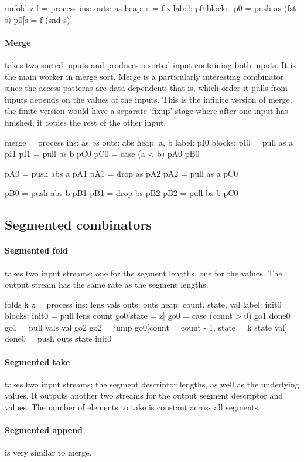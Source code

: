 \begin{code}
unfold z f = process
     ins: 
    outs: as
    heap: {s = f z}
   label: p0
  blocks: p0 = push as (fst s) p0[s = f (snd s)]
\end{code}

\paragraph{Merge} takes two sorted inputs and produces a sorted input containing both inputs.
It is the main worker in merge sort.
Merge is a particularly interesting combinator since the access patterns are data dependent; that is, which order it pulls from inputs depends on the values of the inputs.
This is the infinite version of merge; the finite version would have a separate `fixup' stage where after one input has finished, it copies the rest of the other input.

\begin{code}
merge = process
     ins: as bs
    outs: abs
    heap: {a, b}
   label: pI0
  blocks: pI0 = pull as a  pI1
          pI1 = pull bs b  pC0
          pC0 = case (a < b) pA0 pB0

          pA0 = push abs a pA1
          pA1 = drop as    pA2
          pA2 = pull as  a pC0

          pB0 = push abs b pB1
          pB1 = drop bs    pB2
          pB2 = pull bs  b pC0
\end{code}

\subsection{Segmented combinators}

\paragraph{Segmented fold}
takes two input streams; one for the segment lengths, one for the values.
The output stream has the same rate as the segment lengths.

\begin{code}
folds k z = process
     ins: lens vals
    outs: outs
    heap: {count, state, val}
   label: init0
  blocks: init0 = pull lens count go0[state = z]
          go0   = case (count > 0) go1 done0
          go1   = pull vals val    go2
          go2   = jump go0[count = count - 1, state = k state val]
          done0 = push outs state init0
\end{code}


\paragraph{Segmented take}
takes two input streams; the segment descriptor lengths, as well as the underlying values.
It outputs another two streams for the output segment descriptor and values.
The number of elements to take is constant across all segments.

\paragraph{Segmented append} is very similar to merge.
